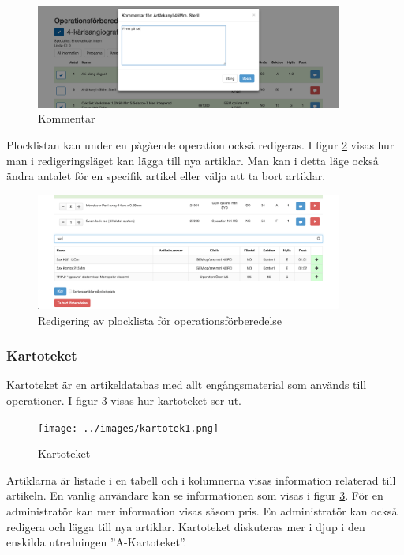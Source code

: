 \begin{figure}[h!]
  \centering
  \includegraphics[width=0.9\textwidth]{images/site/kommentar}
  \caption{Kommentar}
  \label{fig:kommentar}
\end{figure}

Plocklistan kan under en pågående operation också redigeras. I figur \ref{fig:plocklistaredigering} visas hur man i redigeringsläget kan lägga till nya artiklar. Man kan i detta läge också ändra antalet för en specifik artikel eller välja att ta bort artiklar.

\begin{figure}[h!]
  \centering
  \includegraphics[width=0.9\textwidth]{images/site/plocklistaredigering}
  \caption{Redigering av plocklista för operationsförberedelse}
  \label{fig:plocklistaredigering}
\end{figure}

\subsubsection{Kartoteket}
Kartoteket är en artikeldatabas med allt engångsmaterial som används till operationer. I figur \ref{fig:kartoteket} visas hur kartoteket ser ut. 
\begin{figure}[h!]
  \centering
  \texttt{[image: ../images/kartotek1.png]}
  \caption{Kartoteket}
  \label{fig:kartoteket}
\end{figure}
Artiklarna är listade i en tabell och i kolumnerna visas information relaterad till artikeln. En vanlig användare kan se informationen som visas i figur \ref{fig:kartoteket}. För en administratör kan mer information visas såsom pris. En administratör kan också redigera och lägga till nya artiklar. Kartoteket diskuteras mer i djup i den enskilda utredningen ''A-Kartoteket''.%

